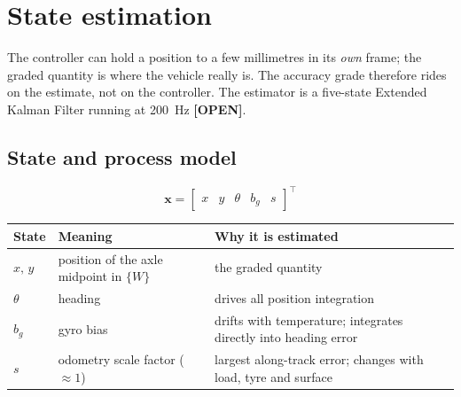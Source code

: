 \documentclass[11pt,a4paper]{article}
\newcommand{\mk}[2]{\textsf{\scriptsize\bfseries\colorbox{#1bg}{\color{#1}[#2]}}}
\newcommand{\OPEN}{\mk{grey}{OPEN}}
\newcommand{\T}{^{\!\top}}
\newcommand{\vect}[1]{\bm{#1}}
\begin{document}
\section{State estimation}\label{sec:ekf}

The controller can hold a position to a few millimetres in its \emph{own}
frame; the graded quantity is where the vehicle really is. The accuracy grade
therefore rides on the estimate, not on the controller. The estimator is a
five-state Extended Kalman Filter running at \qty{200}{Hz} \OPEN.

\subsection{State and process model}

\begin{equation}
\vect x=\begin{bmatrix}x & y & \theta & b_g & s\end{bmatrix}\T
\end{equation}
\begin{center}
\small
\begin{tabularx}{\textwidth}{@{}llL@{}}
\toprule
\textbf{State} & \textbf{Meaning} & \textbf{Why it is estimated}\\
\midrule
$x,\,y$ & position of the axle midpoint in $\{W\}$ & the graded quantity\\
$\theta$ & heading & drives all position integration\\
$b_g$ & gyro bias & drifts with temperature; integrates directly into heading error\\
$s$ & odometry scale factor ($\approx1$) & largest along-track error; changes with load, tyre and surface\\
\bottomrule
\end{tabularx}
\end{center}
\end{document}
